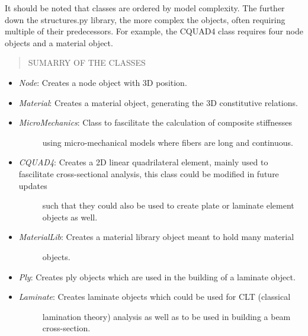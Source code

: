 \documentclass[letterpaper,10pt,english]{sphinxmanual}
\begin{document}
It should be noted that classes are ordered by model complexity. The further
down the structures.py library, the more complex the objects, often requiring
multiple of their predecessors. For example, the CQUAD4 class requires four
node objects and a material object.
\begin{quote}\begin{description}
\item[{SUMARRY OF THE CLASSES}] \leavevmode
\end{description}\end{quote}
\begin{itemize}
\item {} 
\emph{Node}: Creates a node object with 3D position.

\item {} 
\emph{Material}: Creates a material object, generating the 3D constitutive relations.

\item {} \begin{description}
\item[{\emph{MicroMechanics}: Class to fascilitate the calculation of composite stiffnesses}] \leavevmode
using micro-mechanical models where fibers are long and continuous.

\end{description}

\item {} \begin{description}
\item[{\emph{CQUAD4}: Creates a 2D linear quadrilateral element, mainly used to fascilitate    cross-sectional analysis, this class could be modified in future updates}] \leavevmode
such that they could also be used to create plate or laminate element
objects as well.

\end{description}

\item {} \begin{description}
\item[{\emph{MaterialLib}: Creates a material library object meant to hold many material}] \leavevmode
objects.

\end{description}

\item {} 
\emph{Ply}: Creates ply objects which are used in the building of a laminate object.

\item {} \begin{description}
\item[{\emph{Laminate}: Creates laminate objects which could be used for CLT (classical}] \leavevmode
lamination theory) analysis as well as to be used in building a beam
cross-section.


\end{description}
\end{itemize}
\end{document}

